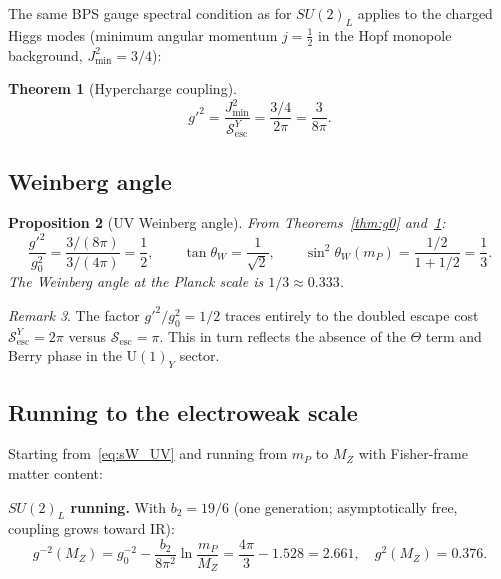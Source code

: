 \documentclass[12pt]{article}
\newtheorem{theorem}{Theorem}[section]
\newtheorem{proposition}[theorem]{Proposition}
\theoremstyle{definition}
\theoremstyle{remark}
\newtheorem{remark}[theorem]{Remark}
\begin{document}
The same BPS gauge spectral condition as for $SU(2)_L$ applies to the charged
Higgs modes (minimum angular momentum $j=\tfrac{1}{2}$ in the Hopf monopole
background, $J^2_{\min}=3/4$):

\begin{theorem}[Hypercharge coupling]
\label{thm:gprime}
\begin{equation}
\boxed{g'^2=\frac{J^2_{\min}}{\mathcal{S}_{\mathrm{esc}}^Y}=\frac{3/4}{2\pi}=\frac{3}{8\pi}.}
\end{equation}
\end{theorem}

\subsection{Weinberg angle}

\begin{proposition}[UV Weinberg angle]
\label{prop:theta_W}
From Theorems~\ref{thm:g0} and~\ref{thm:gprime}:
\begin{equation}
\frac{g'^2}{g_0^2}=\frac{3/(8\pi)}{3/(4\pi)}=\frac{1}{2},\qquad
\tan\theta_W=\frac{1}{\sqrt{2}},\qquad
\sin^2\theta_W(m_P)=\frac{1/2}{1+1/2}=\frac{1}{3}.
\label{eq:sW_UV}
\end{equation}
The Weinberg angle at the Planck scale is $1/3\approx 0.333$.
\end{proposition}

\begin{remark}
The factor $g'^2/g_0^2=1/2$ traces entirely to the doubled escape cost
$\mathcal{S}_{\mathrm{esc}}^Y=2\pi$ versus $\mathcal{S}_{\mathrm{esc}}=\pi$.
This in turn reflects the absence of the $\Theta$ term and Berry phase in the
$\mathrm{U}(1)_Y$ sector.
\end{remark}

\subsection{Running to the electroweak scale}

Starting from~\eqref{eq:sW_UV} and running from $m_P$ to $M_Z$ with
Fisher-frame matter content:

\medskip
\noindent\textbf{$SU(2)_L$ running.}  With $b_2=19/6$ (one generation;
asymptotically free, coupling grows toward IR):
\begin{equation}
g^{-2}(M_Z)=g_0^{-2}-\frac{b_2}{8\pi^2}\ln\frac{m_P}{M_Z}
=\frac{4\pi}{3}-1.528=2.661,\quad g^2(M_Z)=0.376.
\end{equation}
\end{document}
